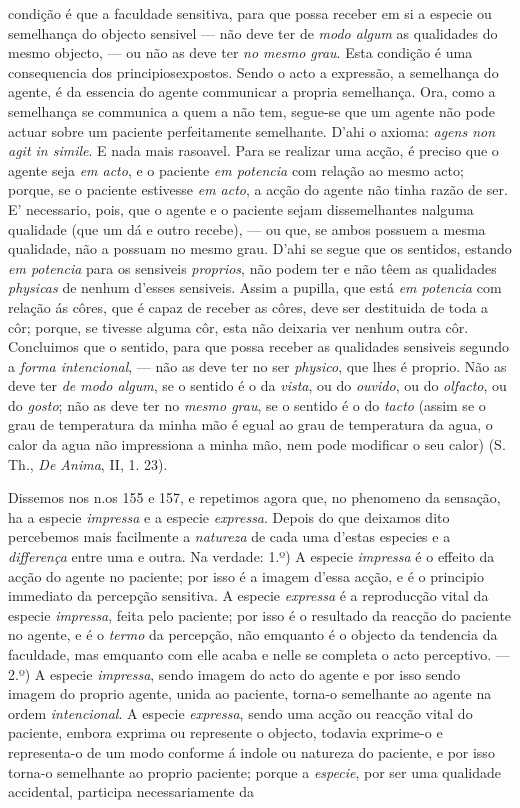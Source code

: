 condição é que a faculdade sensitiva, para que possa receber em si a especie ou semelhança do objecto sensivel --- não deve ter de \emph{modo algum} as qualidades do mesmo objecto, --- ou não as deve ter \emph{no mesmo grau}. Esta condição é uma consequencia dos principiosexpostos. Sendo o acto a expressão, a semelhança do agente, é da essencia do agente communicar a propria semelhança. Ora, como a semelhança se communica a quem a não tem, segue-se que um agente não pode actuar sobre um paciente perfeitamente semelhante. D'ahi o axioma: \emph{agens non agit in simile}. E nada mais rasoavel. Para se realizar uma acção, é preciso que o agente seja \emph{em acto}, e o paciente \emph{em potencia} com relação ao mesmo acto; porque, se o paciente estivesse \emph{em acto}, a acção do agente não tinha razão de ser. E' necessario, pois, que o agente e o paciente sejam dissemelhantes nalguma qualidade (que um dá e outro recebe), --- ou que, se ambos possuem a mesma qualidade, não a possuam no mesmo grau. D'ahi se segue que os sentidos, estando \emph{em potencia} para os sensiveis \emph{proprios}, não podem ter e não têem as qualidades \emph{physicas} de nenhum d'esses sensiveis. Assim a pupilla, que está \emph{em potencia} com relação ás côres, que é capaz de receber as côres, deve ser destituida de toda a côr; porque, se tivesse alguma côr, esta não deixaria ver nenhum outra côr. Concluimos que o sentido, para que possa receber as qualidades sensiveis segundo a \emph{forma intencional}, --- não as deve ter no ser \emph{physico}, que lhes é proprio. Não as deve ter \emph{de modo algum}, se o sentido é o da \emph{vista}, ou do \emph{ouvido}, ou do \emph{olfacto}, ou do \emph{gosto}; não as deve ter no \emph{mesmo grau}, se o sentido é o do \emph{tacto} (assim se o grau de temperatura da minha mão é egual ao grau de temperatura da agua, o calor da agua não impressiona a minha mão, nem pode modificar o seu calor) (S. Th., \emph{De Anima}, II, 1. 23).\par Dissemos nos n.os 155 e 157, e repetimos agora que, no phenomeno da sensação, ha a especie \emph{impressa} e a especie \emph{expressa}. Depois do que deixamos dito percebemos mais facilmente a \emph{natureza} de cada uma d'estas especies e a \emph{differença} entre uma e outra. Na verdade: 1.º) A especie \emph{impressa} é o effeito da acção do agente no paciente; por isso é a imagem d'essa acção, e é o principio immediato da percepção sensitiva. A especie \emph{expressa} é a reproducção vital da especie \emph{impressa}, feita pelo paciente; por isso é o resultado da reacção do paciente no agente, e é o \emph{termo} da percepção, não emquanto é o objecto da tendencia da faculdade, mas emquanto com elle acaba e nelle se completa o acto perceptivo. --- 2.º) A especie \emph{impressa}, sendo imagem do acto do agente e por isso sendo imagem do proprio agente, unida ao paciente, torna-o semelhante ao agente na ordem \emph{intencional}. A especie \emph{expressa}, sendo uma acção ou reacção vital do paciente, embora exprima ou represente o objecto, todavia exprime-o e representa-o de um modo conforme á indole ou natureza do paciente, e por isso torna-o semelhante ao proprio paciente; porque a \emph{especie}, por ser uma qualidade accidental, participa necessariamente da 
